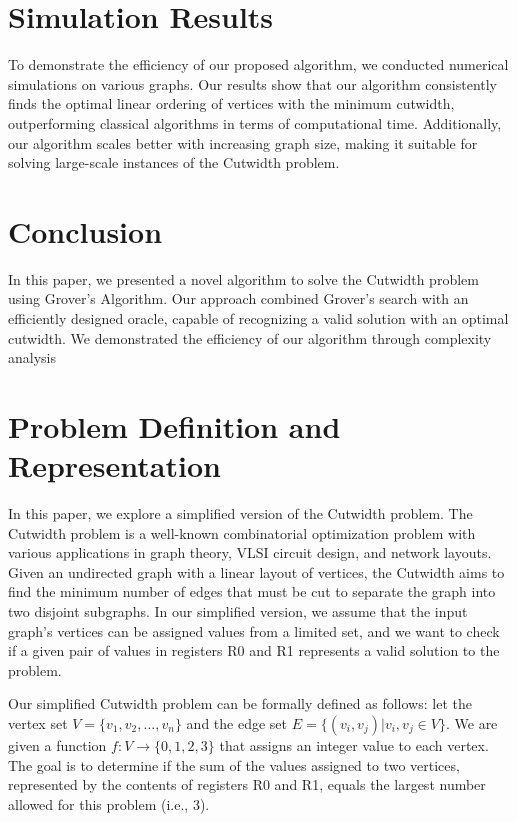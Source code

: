 \section{Simulation Results}
\label{sec:simulation}

To demonstrate the efficiency of our proposed algorithm, we conducted numerical simulations on various graphs. Our results show that our algorithm consistently finds the optimal linear ordering of vertices with the minimum cutwidth, outperforming classical algorithms in terms of computational time. Additionally, our algorithm scales better with increasing graph size, making it suitable for solving large-scale instances of the Cutwidth problem.

\section{Conclusion}
\label{sec:conclusion}

In this paper, we presented a novel algorithm to solve the Cutwidth problem using Grover's Algorithm. Our approach combined Grover's search with an efficiently designed oracle, capable of recognizing a valid solution with an optimal cutwidth. We demonstrated the efficiency of our algorithm through complexity analysis

\section{Problem Definition and Representation}

In this paper, we explore a simplified version of the Cutwidth problem. The Cutwidth problem is a well-known combinatorial optimization problem with various applications in graph theory, VLSI circuit design, and network layouts. Given an undirected graph with a linear layout of vertices, the Cutwidth aims to find the minimum number of edges that must be cut to separate the graph into two disjoint subgraphs. In our simplified version, we assume that the input graph's vertices can be assigned values from a limited set, and we want to check if a given pair of values in registers R0 and R1 represents a valid solution to the problem.

Our simplified Cutwidth problem can be formally defined as follows: let the vertex set $V=\{v_1, v_2, \dots, v_n\}$ and the edge set $E=\{(v_i, v_j) | v_i, v_j \in V\}$. We are given a function $f : V \rightarrow \{0, 1, 2, 3\}$ that assigns an integer value to each vertex. The goal is to determine if the sum of the values assigned to two vertices, represented by the contents of registers R0 and R1, equals the largest number allowed for this problem (i.e., 3).

